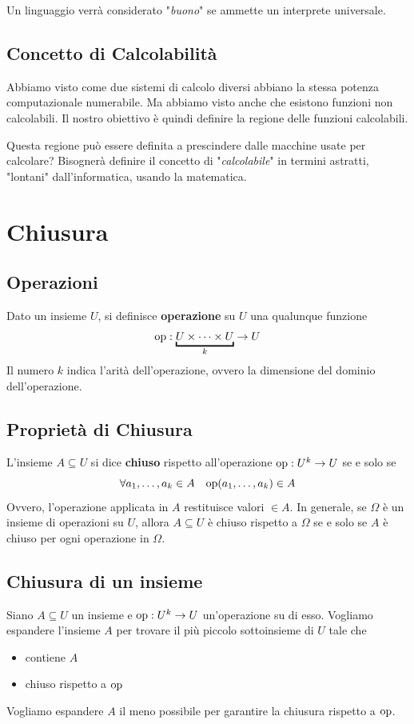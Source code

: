 Un linguaggio verrà considerato "\textit{buono}" se ammette un interprete universale.

\subsection{Concetto di Calcolabilità}

Abbiamo visto come due sistemi di calcolo diversi abbiano la stessa potenza computazionale numerabile. Ma abbiamo visto anche che esistono funzioni non calcolabili. Il nostro obiettivo è quindi definire la regione delle funzioni calcolabili.

Questa regione può essere definita a prescindere dalle macchine usate per calcolare? Bisognerà definire il concetto di "\textit{calcolabile}" in termini astratti, "lontani" dall'informatica, usando la matematica.

\section{Chiusura}
\subsection{Operazioni}
Dato un insieme $U$, si definisce \textbf{operazione} su $U$ una qualunque funzione
$$ \op: \underbracket{U \times \cdots \times U}_k \rightarrow U $$
Il numero $k$ indica l'arità dell'operazione, ovvero la dimensione del dominio dell'operazione.

\subsection{Proprietà di Chiusura}
L'insieme $A \subseteq U$ si dice \textbf{chiuso} rispetto all'operazione $\operatorname{op} : U^k \rightarrow U$ se e solo se
$$ \forall a_1, \dots, a_k \in A \;\;\; \operatorname{op}(a_1, \dots, a_k) \in A $$
Ovvero, l'operazione applicata in $A$ restituisce valori $\in A$. In generale, se $\Omega$ è un insieme di operazioni su $U$, allora $A \subseteq U$ è chiuso rispetto a $\Omega$ se e solo se $A$ è chiuso per ogni operazione in $\Omega$.

\subsection{Chiusura di un insieme}
Siano $A \subseteq U$ un insieme e $\operatorname{op}: U^k \rightarrow U$ un'operazione su di esso. Vogliamo espandere l'insieme $A$ per trovare il più piccolo sottoinsieme di $U$ tale che
\begin{itemize}
	\item contiene $A$
	\item chiuso rispetto a $\operatorname{op}$
\end{itemize}
Vogliamo espandere $A$ il meno possibile per garantire la chiusura rispetto a $\operatorname{op}$.

